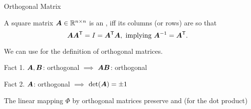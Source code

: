 \documentclass[handout,fleqn,aspectratio=169]{beamer}
\begin{document}
\begin{frame}{Orthogonal Matrix}

\plitemsep 0.05in

\bci 

\item {} A square matrix $\bm{A} \in {\mathbb R}^{n \times n}$ is an , iff its columns (or rows) are  so that 
$$
\bm{A} {\bm{A}}^{\mathsf{T}} = I = {\bm{A}}^{\mathsf{T}}\bm{A}, \text{ implying } {{\bm{A}}^{-1}} = {\bm{A}}^{\mathsf{T}}.
$$
\vspace{-0.3cm}
\bci
\item We can use  for the definition of orthogonal matrices. 
\item Fact 1. $\bm{A},\bm{B}$: orthogonal $\implies$ $\bm{A}\bm{B}$: orthogonal
\item Fact 2. $\bm{A}$: orthogonal $\implies$ $\det(\bm{A}) = \pm 1$
\eci


\item The linear mapping $\Phi$ by orthogonal matrices preserve  and  (for the dot product)
\vspace{-0.7cm}

\eci
\end{frame}



\end{document}
